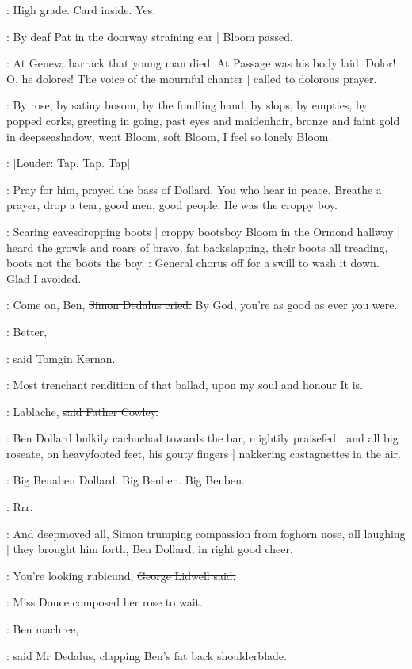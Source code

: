 \BloomInt:
High grade.
Card inside.
Yes.

:
By deaf Pat in the doorway
straining ear |
Bloom passed.

:
At Geneva barrack that young man died.
At Passage was his body laid.
Dolor!
O,
he dolores!
The voice of the mournful chanter |
called to dolorous prayer.

:
By rose,
by satiny bosom,
by the fondling hand,
by slops,
by empties,
by popped corks,
greeting in going,
past eyes and maidenhair,
bronze and faint gold in deepseashadow,
went Bloom,
soft Bloom,
I feel so lonely Bloom.

\stripling:
[Louder:
Tap.
Tap.
Tap]

:
Pray for him,
prayed the bass of Dollard.
You who hear in peace.
Breathe a prayer,
drop a tear,
good men,
good people.
He was the croppy boy.

:
Scaring eavesdropping boots |
croppy bootsboy Bloom in the Ormond hallway |
heard the growls and roars of bravo,
fat backslapping,
their boots all treading,
boots not the boots the boy.
\BloomInt:
General chorus off for a swill to wash it down.
Glad I avoided.

\simon:
Come on,
Ben,
\sout{Simon Dedalus cried.}
By God,
you're as good as ever you were.

:
Better,

:
said Tomgin Kernan.

:
Most trenchant rendition of that ballad,
upon my soul and honour It is.

\cowley:
Lablache,
\sout{said Father Cowley.}

:
Ben Dollard bulkily cachuchad towards the bar,
mightily praisefed |
and all big roseate,
on heavyfooted feet,
his gouty fingers |
nakkering castagnettes in the air.

:
Big Benaben Dollard.
Big Benben.
Big Benben.

:
Rrr.

:
And deepmoved all,
Simon trumping compassion from foghorn nose,
all laughing |
they brought him forth,
Ben Dollard,
in right good cheer.

\lidwell:
You're looking rubicund,
\sout{George Lidwell said.}

:
Miss Douce composed her rose to wait.

\simon:
Ben machree,

:
said Mr Dedalus,
clapping Ben's fat back shoulderblade.

